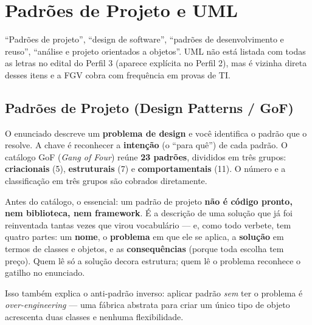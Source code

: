 \chapter{Padrões de Projeto e UML}
\label{cap:padroes-uml}

\begin{edital}
``Padrões de projeto'', ``design de software'', ``padrões de desenvolvimento
e reuso'', ``análise e projeto orientados a objetos''. UML não está listada
com todas as letras no edital do Perfil 3 (aparece explícita no Perfil 2), mas
é vizinha direta desses itens e a FGV cobra com frequência em provas de TI.
\end{edital}

\section{Padrões de Projeto (Design Patterns / GoF)}

O enunciado descreve um \textbf{problema de design} e você identifica o
padrão que o resolve. A chave é reconhecer a \textbf{intenção} (o ``para
quê'') de cada padrão. O catálogo GoF (\emph{Gang of Four}) reúne
\textbf{23 padrões}, divididos em três grupos: \textbf{criacionais} (5),
\textbf{estruturais} (7) e \textbf{comportamentais} (11). O número e a
classificação em três grupos são cobrados diretamente.

Antes do catálogo, o essencial: um padrão de projeto \textbf{não é código
pronto, nem biblioteca, nem framework}. É a descrição de uma solução que já foi
reinventada tantas vezes que virou vocabulário --- e, como todo verbete, tem
quatro partes: um \textbf{nome}, o \textbf{problema} em que ele se aplica, a
\textbf{solução} em termos de classes e objetos, e as \textbf{consequências}
(porque toda escolha tem preço). Quem lê só a solução decora estrutura; quem lê
o problema reconhece o gatilho no enunciado.

Isso também explica o anti-padrão inverso: aplicar padrão \emph{sem} ter o
problema é \emph{over-engineering} --- uma fábrica abstrata para criar um único
tipo de objeto acrescenta duas classes e nenhuma flexibilidade.

